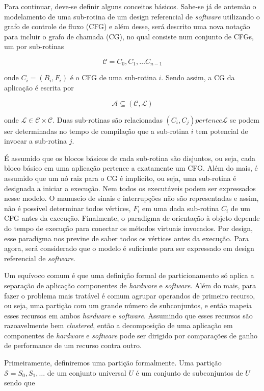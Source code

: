 Para continuar, deve-se definir alguns conceitos básicos. Sabe-se já de antemão o modelamento de uma sub-rotina de um design referencial de \textit{software} utilizando o grafo de controle de fluxo (CFG) e além desse, será descrito uma nova notação para incluir o grafo de chamada (CG), no qual consiste num conjunto de CFGs, um por sub-rotinas 

$$ \mathcal{C} = {C_0, C_1, \dots C_{n-1}} $$ 

onde $ C_i = (B_i, F_i) $ é o CFG de uma sub-rotina $ i $. Sendo assim, a CG da aplicação é escrita por 

$$ \mathcal{A} \subseteq (\mathcal{C}, \mathcal{L}) $$ 

onde $ \mathcal{L} \in \mathcal{C} \times \mathcal{C} $. Duas sub-rotinas são relacionadas $ (C_i, C_j) pertence \mathcal{L} $ se podem ser determinadas no tempo de compilação que a sub-rotina $ i $ tem potencial de invocar a sub-rotina $ j $.

É assumido que os blocos básicos de cada sub-rotina são disjuntos, ou seja, cada bloco básico em uma aplicação pertence a exatamente um CFG. Além do mais, é assumido que um nó raiz para o CG é implícito, ou seja, uma sub-rotina é designada a iniciar a execução. Nem todos os executáveis podem ser expressados nesse modelo. O manuseio de sinais e interrupções não são representadas e assim, não é possível determinar todos vértices, $ F_i $ em uma dada sub-rotina $ C_i $ de um CFG antes da execução. Finalmente, o paradigma de orientação à objeto depende do tempo de execução para conectar os métodos virtuais invocados. Por design, esse paradigma nos previne de saber todos os vértices antes da execução. Para agora, será considerado que o modelo é suficiente para ser expressado em design referencial de \textit{software}. 

Um equívoco comum é que uma definição formal de particionamento só aplica a separação de aplicação componentes de \textit{hardware} e \textit{software}. Além do mais, para fazer o problema mais tratável é comum agrupar operandos de primeiro recurso, ou seja, uma partição com um grande número de subconjuntos, e então mapeia esses recursos em ambos \textit{hardware} e \textit{software}. Assumindo que esses recursos são razoavelmente bem \textit{clustered}, então a decomposição de uma aplicação em componentes de \textit{hardware} e \textit{software} pode ser dirigido por comparações de ganho de performance de um recurso contra outro.

Primeiramente, definiremos uma partição formalmente. Uma partição $ \mathcal{S} = {S_0, S_1, \dots}$ de um conjunto universal $ U $ é um conjunto de subconjuntos de $ U $ sendo que 

